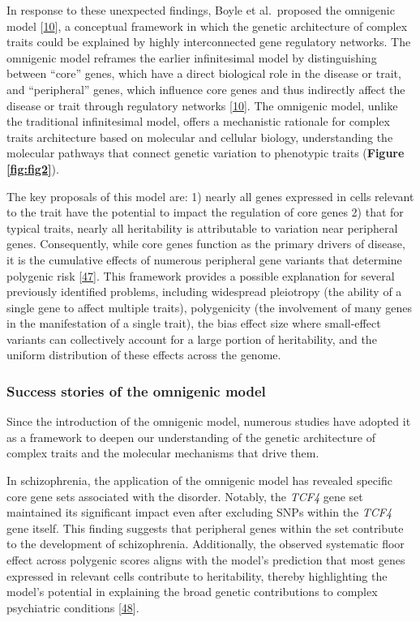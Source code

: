 In response to these unexpected findings, Boyle et al.~proposed the omnigenic model {[}\protect\hyperlink{ref-vpIDZCSa}{10}{]}, a conceptual framework in which the genetic architecture of complex traits could be explained by highly interconnected gene regulatory networks.
The omnigenic model reframes the earlier infinitesimal model by distinguishing between ``core'' genes, which have a direct biological role in the disease or trait, and ``peripheral'' genes, which influence core genes and thus indirectly affect the disease or trait through regulatory networks {[}\protect\hyperlink{ref-vpIDZCSa}{10}{]}.
The omnigenic model, unlike the traditional infinitesimal model, offers a mechanistic rationale for complex traits architecture based on molecular and cellular biology, understanding the molecular pathways that connect genetic variation to phenotypic traits (\textbf{Figure \ref{fig:fig2}}).

The key proposals of this model are: 1) nearly all genes expressed in cells relevant to the trait have the potential to impact the regulation of core genes 2) that for typical traits, nearly all heritability is attributable to variation near peripheral genes.
Consequently, while core genes function as the primary drivers of disease, it is the cumulative effects of numerous peripheral gene variants that determine polygenic risk {[}\protect\hyperlink{ref-LXvTZzEA}{47}{]}.
This framework provides a possible explanation for several previously identified problems, including widespread pleiotropy (the ability of a single gene to affect multiple traits), polygenicity (the involvement of many genes in the manifestation of a single trait), the bias effect size where small-effect variants can collectively account for a large portion of heritability, and the uniform distribution of these effects across the genome.

\hypertarget{success-stories-of-the-omnigenic-model}{%
\subsubsection{Success stories of the omnigenic model}\label{success-stories-of-the-omnigenic-model}}

Since the introduction of the omnigenic model, numerous studies have adopted it as a framework to deepen our understanding of the genetic architecture of complex traits and the molecular mechanisms that drive them.

In schizophrenia, the application of the omnigenic model has revealed specific core gene sets associated with the disorder.
Notably, the \emph{TCF4} gene set maintained its significant impact even after excluding SNPs within the \emph{TCF4} gene itself.
This finding suggests that peripheral genes within the set contribute to the development of schizophrenia.
Additionally, the observed systematic floor effect across polygenic scores aligns with the model's prediction that most genes expressed in relevant cells contribute to heritability, thereby highlighting the model's potential in explaining the broad genetic contributions to complex psychiatric conditions {[}\protect\hyperlink{ref-fV6THoBG}{48}{]}.

